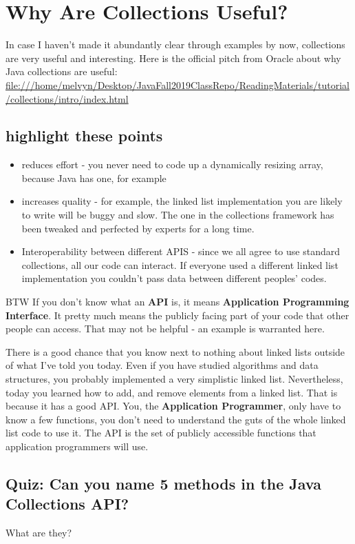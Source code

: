 \documentclass[12pt]{article}
\begin{document}
\section{Why Are Collections Useful?}
In case I haven't made it abundantly clear through examples by now, collections are very useful and interesting. Here is the official pitch from Oracle about why Java collections are useful:
\url{file:///home/melvyn/Desktop/JavaFall2019ClassRepo/ReadingMaterials/tutorial/collections/intro/index.html}

\subsection{highlight these points}
\begin{itemize}
\item reduces effort - you never need to code up a dynamically resizing array, because Java has one, for example
\item increases quality - for example, the linked list implementation you are likely to write will be buggy and slow. The one in the collections framework has been tweaked and perfected by experts for a long time.
\item Interoperability between different APIS - since we all agree to use standard collections, all our code can interact. If everyone used a different linked list implementation you couldn't pass data between different peoples' codes.
\end{itemize}

BTW If you don't know what an \textbf{API} is, it means \textbf{Application Programming Interface}. It pretty much means the publicly facing part of your code that other people can access. That may not be helpful - an example is warranted here.

There is a good chance that you know next to nothing about linked lists outside of what I've told you today. Even if you have studied algorithms and data structures, you probably implemented a very simplistic linked list. Nevertheless, today you learned how to add, and remove elements from a linked list. That is because it has a good API. You, the \textbf{Application Programmer}, only have to know a few functions, you don't need to understand the guts of the whole linked list code to use it. The API is the set of publicly accessible functions that application programmers will use.

\subsection{Quiz: Can you name 5 methods in the Java Collections API?}
What are they?
\end{document}
